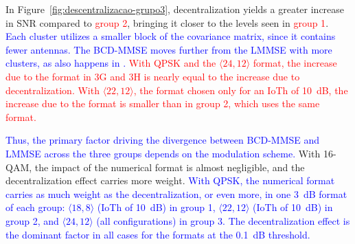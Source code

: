 \label{subsubsec:descentralizacao-grupo3}%

In Figure~\ref{fig:descentralizacao-grupo3}, decentralization yields a greater increase in SNR compared to \textcolor{red}{group 2}, bringing it closer to the levels seen in \textcolor{red}{group 1}. \textcolor{blue}{Each cluster utilizes a smaller block of the covariance matrix, since it contains fewer antennas.} \textcolor{blue}{The BCD-MMSE moves further from the LMMSE with more clusters, as also happens in \cite{zhao2025jsac}.} \textcolor{red}{With QPSK and the $\langle 24,12\rangle$ format, the increase due to the format in 3G and 3H is nearly equal to the increase due to decentralization. With $\langle 22,12\rangle$, the format chosen only for an IoTh of 10~dB, the increase due to the format is smaller than in group 2, which uses the same format.}

\textcolor{blue}{Thus, the primary factor driving the divergence between BCD-MMSE and LMMSE across the three groups depends on the modulation scheme.} With 16-QAM, the impact of the numerical format is almost negligible, and the decentralization effect carries more weight. \textcolor{blue}{With QPSK, the numerical format carries as much weight as the decentralization, or even more, in one 3~dB format of each group: $\langle 18,8\rangle$ (IoTh of 10~dB) in group 1, $\langle 22,12\rangle$ (IoTh of 10~dB) in group 2, and $\langle 24,12\rangle$ (all configurations) in group 3.} \textcolor{blue}{The decentralization effect is the dominant factor in all cases for the formats at the 0.1~dB threshold.}

\FloatBarrier
